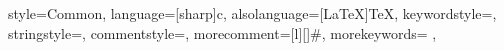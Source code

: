 
{
    style=Common,
    language=[sharp]{c},
    alsolanguage={[LaTeX]TeX},
                keywordstyle=\color{blue},
                stringstyle=\color{red},
                commentstyle=\color{green},
                morecomment=[l][\color{magenta}]{\#},
    morekeywords=
    {
    },
}
